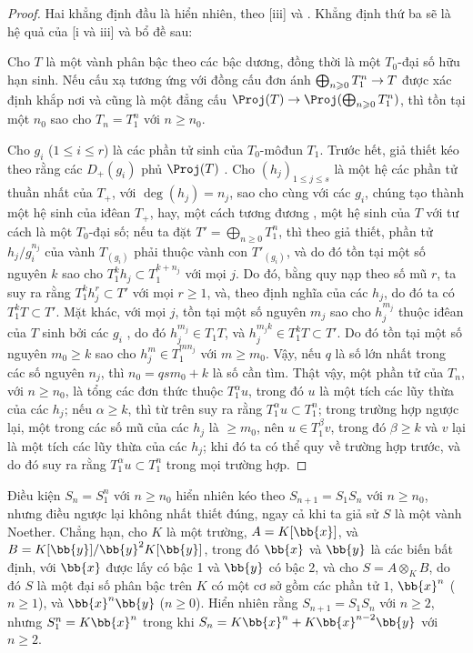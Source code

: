 \documentclass[oneside,10pt]{amsart}
\makeatletter
\renewcommand{\leq}{\leqslant}
\renewcommand{\geq}{\geqslant}
\newcommand{\ega@arrow}[2]{\mathchoice{#1}{#2}{#2}{#2}}
\renewcommand{\to}{\ega@arrow{\longrightarrow}{\rightarrow}}
\newcommand{\oldpage}[2][]{\marginnote{\normalfont\footnotesize\textbf{#1}~|~#2}\ignorespaces}
\let\EGAOriginalLabel\label
\renewcommand{\label}[1]{\phantomsection\EGAOriginalLabel{#1}}
\makeatother
\begin{document}
\begin{proof}
Hai khẳng định đầu là hiển nhiên, theo [iii] và .
Khẳng định thứ ba sẽ là hệ quả của [i và iii] và bổ đề sau:
\begin{lemma}[8.2.14.1]
\label{II.8.2.14.1}
Cho $T$ là một vành phân bậc theo các bậc dương, đồng thời là một $T_0$-đại số hữu hạn sinh.
Nếu cấu xạ tương ứng với đồng cấu đơn ánh $\bigoplus_{n\geq0}T_1^n\to T$ được xác định khắp nơi và cũng là một đẳng cấu $\Proj(T)\to\Proj(\bigoplus_{n\geq0}T_1^n)$, thì tồn tại một $n_0$ sao cho $T_n=T_1^n$ với $n\geq n_0$.
\end{lemma}

Cho $g_i$ ($1\leq i\leq r$) là các phần tử sinh của $T_0$-môđun $T_1$.
Trước hết, giả thiết kéo theo rằng các $D_+(g_i)$ phủ $\Proj(T)$ .
Cho $(h_j)_{1\leq j\leq s}$ là một hệ các phần tử thuần nhất của $T_+$, với $\deg(h_j)=n_j$, sao cho cùng với các $g_i$, chúng tạo thành một hệ sinh của iđêan $T_+$, hay, một cách tương đương , một hệ sinh của $T$ với tư cách là một $T_0$-đại số;
nếu ta đặt $T'=\bigoplus_{n\geq0}T_1^n$, thì theo giả thiết, phần tử $h_j/g_i^{n_j}$ của vành $T_{(g_i)}$ phải thuộc vành con $T'_{(g_i)}$, và do đó tồn tại một số nguyên $k$ sao cho $T_1^k h_j\subset T_1^{k+n_j}$ với mọi $j$.
Do đó, bằng quy nạp theo số mũ $r$, ta suy ra rằng $T_1^k h_j^r \subset T'$ với mọi $r\geq1$, và, theo định nghĩa của các $h_j$, do đó ta có $T_1^k T\subset T'$.
Mặt khác, với mọi $j$, tồn tại một số nguyên $m_j$ sao cho $h_j^{m_j}$ thuộc iđêan của $T$ sinh bởi các $g_i$ , do đó $h_j^{m_j}\in T_1 T$, và
\oldpage[II]{162}
$h_j^{m_j k}\in T_1^k T\subset T'$.
Do đó tồn tại một số nguyên $m_0\geq k$ sao cho $h_j^m\in T_1^{m n_j}$ với $m\geq m_0$.
Vậy, nếu $q$ là số lớn nhất trong các số nguyên $n_j$, thì $n_0=q s m_0+k$ là số cần tìm.
Thật vậy, một phần tử của $T_n$, với $n\geq n_0$, là tổng các đơn thức thuộc $T_1^\alpha u$, trong đó $u$ là một tích các lũy thừa của các $h_j$;
nếu $\alpha\geq k$, thì từ trên suy ra rằng $T_1^\alpha u\subset T_1^n$;
trong trường hợp ngược lại, một trong các số mũ của các $h_j$ là $\geq m_0$, nên $u\in T_1^\beta v$, trong đó $\beta\geq k$ và $v$ lại là một tích các lũy thừa của các $h_j$;
khi đó ta có thể quy về trường hợp trước, và do đó suy ra rằng $T_1^\alpha u\subset T_1^n$ trong mọi trường hợp.
\end{proof}

\begin{remark}[8.2.15]
\label{II.8.2.15}
Điều kiện $S_n=S_1^n$ với $n\geq n_0$ hiển nhiên kéo theo $S_{n+1}=S_1S_n$ với $n\geq n_0$, nhưng điều ngược lại không nhất thiết đúng, ngay cả khi ta giả sử $S$ là một vành Noether.
Chẳng hạn, cho $K$ là một trường, $A=K[\bb{x}]$, và $B=K[\bb{y}]/\bb{y}^2K[\bb{y}]$, trong đó $\bb{x}$ và $\bb{y}$ là các biến bất định, với $\bb{x}$ được lấy có bậc 1 và $\bb{y}$ có bậc 2, và cho $S=A\otimes_K B$, do đó $S$ là một đại số phân bậc trên $K$ có một cơ sở gồm các phần tử $1$, $\bb{x}^n$ ($n\geq1$), và $\bb{x}^n\bb{y}$ ($n\geq0$).
Hiển nhiên rằng $S_{n+1}=S_1S_n$ với $n\geq2$, nhưng $S_1^n=K\bb{x}^n$ trong khi $S_n=K\bb{x}^n+K\bb{x}^{n-2}\bb{y}$ với $n\geq2$.
\end{remark}
\end{document}
